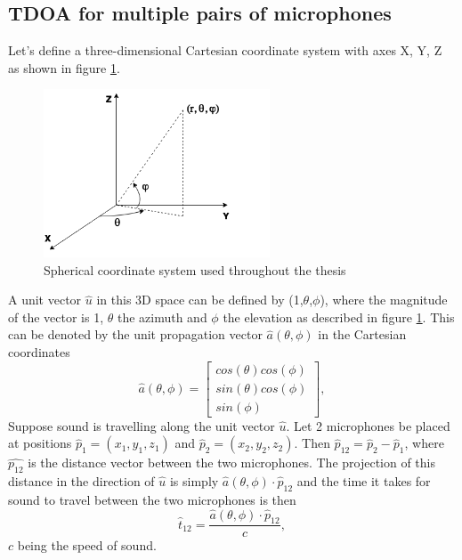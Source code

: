 \subsection{TDOA for multiple pairs of microphones}
Let's define a three-dimensional Cartesian coordinate system with axes X, Y, Z as shown in figure \ref{fig:3daxis}. 
\begin{figure}[H]
    \centering
    \includegraphics[width=0.6\textwidth]{Figures/3dCoord.png}
    \caption{Spherical coordinate system used throughout the thesis}
    \label{fig:3daxis}
\end{figure}
A unit vector $\hat{u}$ in this 3D space can be defined by (1,$\theta$,$\phi$), where the magnitude of the vector is 1, $\theta$ the azimuth and $\phi$ the elevation as described in figure \ref{fig:3daxis}. This can be denoted by the unit propagation vector ${\hat{a}(\theta,\phi)}$ in the Cartesian coordinates
\begin{equation}
    \hat{a}(\theta,\phi)=\begin{bmatrix}cos(\theta)cos(\phi) \\sin(\theta)cos(\phi) \\sin(\phi)\end{bmatrix},
\end{equation}
Suppose sound is travelling along the unit vector $\hat{u}$. Let 2 microphones be placed at positions $\hat{p}_1=(x_1,y_1,z_1)$ and $\hat{p}_2=(x_2,y_2,z_2)$.  Then $\hat{p}_{12}=\hat{p}_{2}-\hat{p}_{1}$, where ${\hat{p_{12}}}$ is the distance vector between the two microphones. The projection of this distance in the direction of $\hat{u}$ is simply $\hat{a}(\theta,\phi)\cdot\hat{p}_{12}$ and the time it takes for sound to travel between the two microphones is then 
\begin{equation}
    \hat{t}_{12}=\frac{\hat{a}(\theta,\phi)\cdot\hat{p}_{12}}{c},
\end{equation} $c$ being the speed of sound. 

